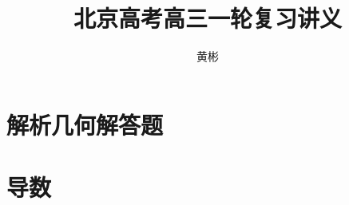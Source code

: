 \documentclass[lang=cn,newtx,10pt,scheme=chinese]{elegantbook}
\title{北京高考高三一轮复习讲义}
\author{黄彬}
\begin{document}
\maketitle
\frontmatter

\tableofcontents

\mainmatter

\chapter{解析几何解答题}











\chapter{导数}







\end{document}

